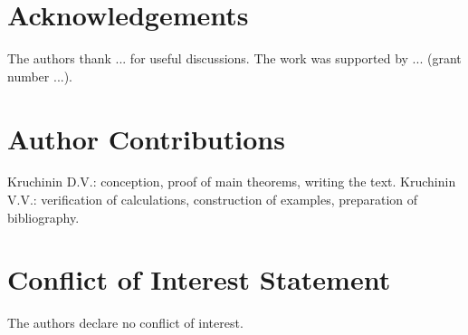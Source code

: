\documentclass[12pt]{article}
\begin{document}
\section*{Acknowledgements}
The authors thank ... for useful discussions. The work was supported by ... (grant number ...).

\section*{Author Contributions}
Kruchinin D.V.: conception, proof of main theorems, writing the text. Kruchinin V.V.: verification of calculations, construction of examples, preparation of bibliography.

\section*{Conflict of Interest Statement}
The authors declare no conflict of interest.

\end{document}
